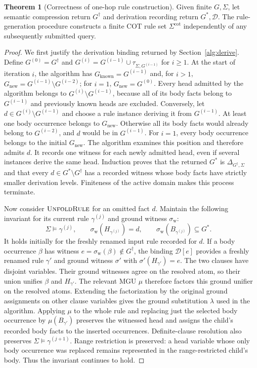 \documentclass[conference]{IEEEtran}
\theoremstyle{definition}
\newtheorem{theorem}{Theorem}
\newcommand{\Gc}{G^{\dagger}}
\newcommand{\Gknown}{G_{\mathrm{known}}}
\newcommand{\Gfront}{G_{\mathrm{new}}}
\newcommand{\Sig}{\Sigma}
\newcommand{\Sigcot}{\Sig^{\mathrm{cot}}}
\newcommand{\Der}{\mathcal{D}}
\newcommand{\COT}{\textsc{COT}}
\newcommand{\FunctionName}[1]{\textsc{#1}}
\newcommand{\algref}[1]{Section~\ref{#1}}
\begin{document}
\begin{theorem}[Correctness of one-hop rule construction]
\label{thm:cot}
Given finite $G,\Sig$, let semantic compression return $\Gc$ and
derivation recording return $G^{*},\Der$. The rule-generation
procedure constructs a finite \COT{} rule set $\Sigcot$ independently
of any subsequently submitted query.
\end{theorem}

\begin{proof}
We first justify the derivation binding returned by
\algref{alg:derive}. Define $G^{(0)}=\Gc$ and
$G^{(i)}=G^{(i-1)}\cup\tau_{\Sig,G^{(i-1)}}$ for $i\geq1$.
At the start of iteration $i$, the algorithm has $\Gknown=G^{(i-1)}$
and, for $i>1$, $\Gfront=G^{(i-1)}\setminus G^{(i-2)}$;
for $i=1$, $\Gfront=G^{(0)}$. Every head admitted by the algorithm
belongs to $G^{(i)}\setminus G^{(i-1)}$, because all of its body facts
belong to $G^{(i-1)}$ and previously known heads are excluded.
Conversely, let $d\in G^{(i)}\setminus G^{(i-1)}$ and choose a rule
instance deriving it from $G^{(i-1)}$. At least one body occurrence
belongs to $\Gfront$. Otherwise all its body facts would
already belong to $G^{(i-2)}$, and $d$ would be in $G^{(i-1)}$.
For $i=1$, every body occurrence belongs to the initial $\Gfront$.
The algorithm examines this position and therefore admits $d$.
It records one witness for each newly admitted head, even if several
instances derive the same head. Induction proves that the returned
$G^{*}$ is $\Delta_{\Gc,\Sig}$ and that every
$d\in G^{*}\setminus\Gc$ has a recorded witness whose body facts
have strictly smaller derivation levels. Finiteness of the active
domain makes this process terminate.

Now consider $\FunctionName{UnfoldRule}$ for an omitted fact $d$.
Maintain the following invariant for its current rule $\gamma^{(j)}$ and
ground witness $\sigma_{\mathrm w}$:
\[
\Sig\models\gamma^{(j)},\qquad
\sigma_{\mathrm w}(H_{\gamma^{(j)}})=d,\qquad
\sigma_{\mathrm w}(B_{\gamma^{(j)}})\subseteq G^{*}.
\]
It holds initially for the freshly renamed input rule recorded for
$d$. If a body occurrence $\beta$ has witness
$e=\sigma_{\mathrm w}(\beta)\notin\Gc$, the binding $\Der[e]$
provides a freshly renamed rule $\gamma'$ and ground witness
$\sigma'$ with $\sigma'(H_{\gamma'})=e$.
The two clauses have disjoint variables. Their ground witnesses
agree on the resolved atom, so their union unifies
$\beta$ and $H_{\gamma'}$. The relevant MGU $\mu$ therefore
factors this ground unifier on the resolved atoms. Extending the
factorization by the original ground assignments on other clause
variables gives the ground substitution $\lambda$ used in the
algorithm.
Applying $\mu$ to the whole rule and replacing just the selected
body occurrence by $\mu(B_{\gamma'})$ preserves the witnessed
head and assigns the child's recorded body facts to the inserted
occurrences. Definite-clause resolution also preserves
$\Sig\models\gamma^{(j+1)}$. Range restriction is preserved: a head variable
whose only body occurrence was replaced remains represented in the
range-restricted child's body. Thus the invariant continues to hold.


\end{proof}
\end{document}
